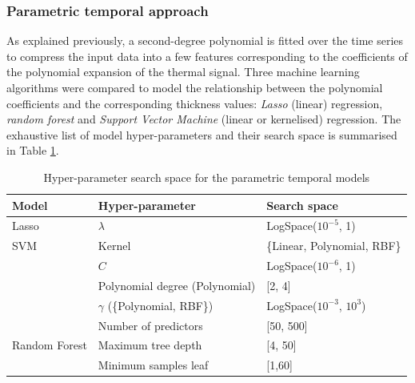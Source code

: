 \subsubsection{Parametric temporal approach}

As explained previously, a second-degree polynomial is fitted over the time series to compress the input data into a few features corresponding to the coefficients of the polynomial expansion of the thermal signal. Three machine learning algorithms were compared to model the relationship between the polynomial coefficients and the corresponding thickness values: \textit{Lasso} (linear) regression, \textit{random forest} and \textit{Support Vector Machine} (linear or kernelised) regression. 
%
The exhaustive list of model hyper-parameters and their search space is summarised in Table \ref{tab:Parametric Temporal_search_space}.

\begin{table}
\centering
\caption{Hyper-parameter search space for the parametric temporal models}
\label{tab:Parametric Temporal_search_space}
\begin{tabular}{lll} 
\toprule
\textbf{Model}                            & \textbf{Hyper-parameter} & \textbf{Search space}                          \\ 
\midrule
Lasso                                     & $\lambda$                & LogSpace($10^{-5}$, 1)                          \\ 
\midrule
SVM  & Kernel                   & \{Linear, Polynomial, RBF\}  \\ 
\cline{2-3}
                                          & $C$                        & LogSpace($10^{-6}$, 1)                          \\ 
\cline{2-3}
                                          & Polynomial degree (Polynomial) & [2, 4] \\
\cline{2-3}
                                          & $\gamma$ (\{Polynomial, RBF\}) & LogSpace($10^{-3}$, $10^{3}$) \\
                                          
\midrule
\multirow{3}{*}{Random Forest}  & Number of predictors     & [50, 500]                       \\ 
\cline{2-3}
                                          & Maximum tree depth       & [4, 50]                           \\ 
\cline{2-3}
                                          & Minimum samples leaf     & [1,60]                           \\
\bottomrule
\end{tabular}
\end{table}

